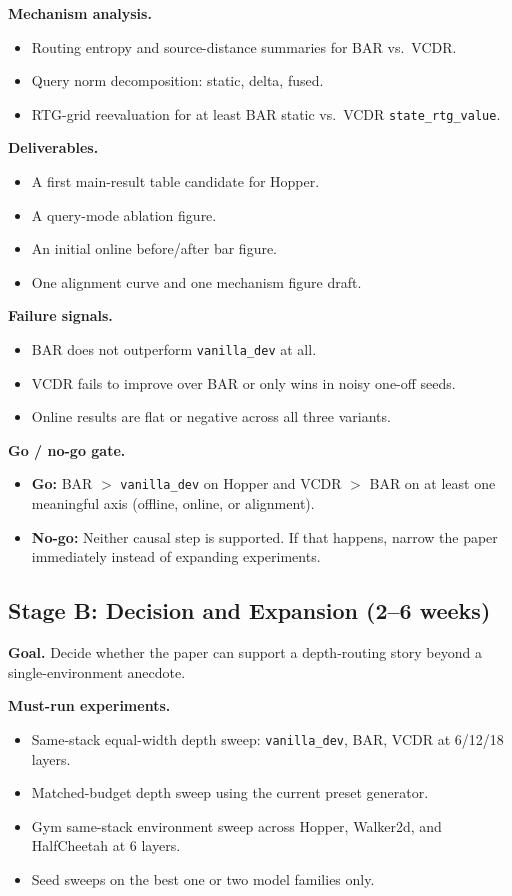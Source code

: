 \documentclass[11pt]{article}
\newcommand{\vanilla}{\texttt{vanilla\_dev}}
\begin{document}
\textbf{Mechanism analysis.}
\begin{itemize}
  \item Routing entropy and source-distance summaries for BAR vs.\ VCDR.
  \item Query norm decomposition: static, delta, fused.
  \item RTG-grid reevaluation for at least BAR static vs.\ VCDR \texttt{state\_rtg\_value}.
\end{itemize}

\textbf{Deliverables.}
\begin{itemize}
  \item A first main-result table candidate for Hopper.
  \item A query-mode ablation figure.
  \item An initial online before/after bar figure.
  \item One alignment curve and one mechanism figure draft.
\end{itemize}

\textbf{Failure signals.}
\begin{itemize}
  \item BAR does not outperform \vanilla{} at all.
  \item VCDR fails to improve over BAR or only wins in noisy one-off seeds.
  \item Online results are flat or negative across all three variants.
\end{itemize}

\textbf{Go / no-go gate.}
\begin{itemize}
  \item \textbf{Go:} BAR \(>\) \vanilla{} on Hopper and VCDR \(>\) BAR on at least one meaningful axis (offline, online, or alignment).
  \item \textbf{No-go:} Neither causal step is supported. If that happens, narrow the paper immediately instead of expanding experiments.
\end{itemize}

\subsection*{Stage B: Decision and Expansion (2--6 weeks)}

\textbf{Goal.} Decide whether the paper can support a depth-routing story beyond a single-environment anecdote.

\textbf{Must-run experiments.}
\begin{itemize}
  \item Same-stack equal-width depth sweep: \vanilla{}, BAR, VCDR at 6/12/18 layers.
  \item Matched-budget depth sweep using the current preset generator.
  \item Gym same-stack environment sweep across Hopper, Walker2d, and HalfCheetah at 6 layers.
  \item Seed sweeps on the best one or two model families only.
\end{itemize}
\end{document}
